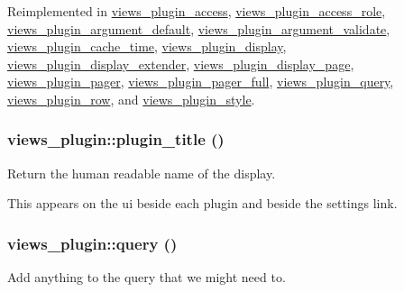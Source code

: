 Reimplemented in \hyperlink{classviews__plugin__access_a1ac0bea409be6ef8d7eb4bfafcf760c6}{views\_\-plugin\_\-access}, \hyperlink{classviews__plugin__access__role_a82fda91cd55acbbcac1759448c8fc471}{views\_\-plugin\_\-access\_\-role}, \hyperlink{classviews__plugin__argument__default_a39f9ba2c80352fe029e765771a7af3a5}{views\_\-plugin\_\-argument\_\-default}, \hyperlink{classviews__plugin__argument__validate_a3b9d9986adaf8e1d57d5b1b62ab712b0}{views\_\-plugin\_\-argument\_\-validate}, \hyperlink{classviews__plugin__cache__time_a095bb0d313db8eef7521928923a6f261}{views\_\-plugin\_\-cache\_\-time}, \hyperlink{classviews__plugin__display_a0b4336df4db25dec552de8d20141a9f5}{views\_\-plugin\_\-display}, \hyperlink{classviews__plugin__display__extender_a0a0fe3d8d71d295e99a72c371160515c}{views\_\-plugin\_\-display\_\-extender}, \hyperlink{classviews__plugin__display__page_a192c8feb8740fdb389600fb7a8588c27}{views\_\-plugin\_\-display\_\-page}, \hyperlink{classviews__plugin__pager_a5988e87c8ebcaed872cad117e9721515}{views\_\-plugin\_\-pager}, \hyperlink{classviews__plugin__pager__full_a00fca2bdd3dfda2bea07b01a6f8384a4}{views\_\-plugin\_\-pager\_\-full}, \hyperlink{classviews__plugin__query_ad40827dad9fa00e8a1ff57d8a8d979de}{views\_\-plugin\_\-query}, \hyperlink{classviews__plugin__row_a32906ab357ff63a5e6ea22d53c3a5e6a}{views\_\-plugin\_\-row}, and \hyperlink{classviews__plugin__style_acdfd8cc26a594b82aaf56d205ac83b36}{views\_\-plugin\_\-style}.\hypertarget{classviews__plugin_a8e3f150d04decf60cfe7220f2d220065}{
\subsubsection[{plugin\_\-title}]{\setlength{\rightskip}{0pt plus 5cm}views\_\-plugin::plugin\_\-title ()}}
\label{classviews__plugin_a8e3f150d04decf60cfe7220f2d220065}
Return the human readable name of the display.

This appears on the ui beside each plugin and beside the settings link. \hypertarget{classviews__plugin_a10ac07c47c4a8735786f9fcc38548587}{
\subsubsection[{query}]{\setlength{\rightskip}{0pt plus 5cm}views\_\-plugin::query ()}}
\label{classviews__plugin_a10ac07c47c4a8735786f9fcc38548587}
Add anything to the query that we might need to. 

